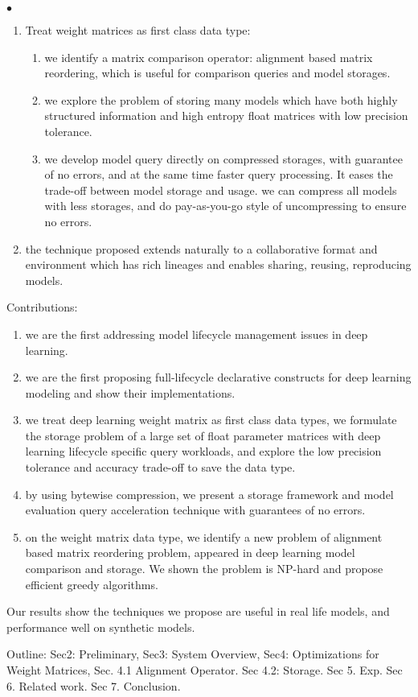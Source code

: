 \documentclass[conference]{IEEEtran}
\begin{document}
{\begin{list}{$\bullet$}{\leftmargin 0.15in \topsep 0pt \itemsep -3pt}
\begin{enumerate}
  \item Treat weight matrices as first class data type:
    \begin{enumerate}
      \item we identify a matrix comparison operator: alignment based matrix reordering, which is useful for comparison queries and model storages.
      \item we explore the problem of storing many models which have both highly structured information and high entropy float matrices with low precision tolerance. 
      \item we develop model query directly on compressed storages, with guarantee of no errors, and at the same time faster query processing.
      It eases the trade-off between model storage and usage. we can compress all models with less storages, and do pay-as-you-go style of uncompressing to ensure no errors.
    \end{enumerate}
  \item the technique proposed extends naturally to a collaborative format and environment which has rich lineages and enables sharing, reusing, reproducing models. 
\end{enumerate}
\item Contributions:
\begin{enumerate}
  \item we are the first addressing model lifecycle management issues in deep learning. 
  \item we are the first proposing full-lifecycle declarative constructs for deep learning modeling and show their implementations.
  \item we treat deep learning weight matrix as first class data types, we formulate the storage problem of a large set of float parameter matrices with deep learning lifecycle specific query workloads, and explore the low precision tolerance and accuracy trade-off to save the data type.
  \item by using bytewise compression, we present a storage framework and model evaluation query acceleration technique with guarantees of no errors.
  \item on the weight matrix data type, we identify a new problem of alignment based matrix reordering problem, appeared in deep learning model comparison and storage. We shown the problem is NP-hard and propose efficient greedy algorithms.
\end{enumerate}
\item Our results show the techniques we propose are useful in real life models, and performance well on synthetic models. 
\item Outline: Sec2: Preliminary, Sec3: System Overview, Sec4: Optimizations for Weight Matrices, Sec. 4.1 Alignment Operator. Sec 4.2: Storage. Sec 5. Exp. Sec 6. Related work. Sec 7. Conclusion.
\end{list}


\quad \vfill
\pagebreak 
}
\end{document}
